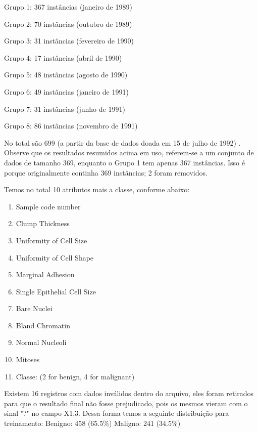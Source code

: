 \documentclass[conference]{IEEEtran}
\begin{document}
\begin{description}
     \item Grupo 1: 367 instâncias (janeiro de 1989)
     \item Grupo 2: 70 instâncias (outubro de 1989)
     \item Grupo 3: 31 instâncias (fevereiro de 1990)
     \item Grupo 4: 17 instâncias (abril de 1990)
     \item Grupo 5: 48 instâncias (agosto de 1990)
     \item Grupo 6: 49 instâncias (janeiro de 1991)
     \item Grupo 7: 31 instâncias (junho de 1991)
     \item Grupo 8: 86 instâncias (novembro de 1991)
\end{description}
    No total são 699 (a partir da base de dados doada em 15 de julho de 1992) \cite{b10} \cite{b11}. Observe que os resultados resumidos acima em uso, referem-se a um conjunto de dados
    de tamanho 369, enquanto o Grupo 1 tem apenas 367 instâncias. Isso é porque originalmente continha 369 instâncias; 2 foram removidos. 
   
   Temos no total 10 atributos mais a classe, conforme abaixo:
    \begin{enumerate}
    
   \item  Sample code number
   \item  Clump Thickness
   \item  Uniformity of Cell Size
   \item  Uniformity of Cell Shape
   \item  Marginal Adhesion
   \item  Single Epithelial Cell Size
   \item  Bare Nuclei
   \item  Bland Chromatin
   \item  Normal Nucleoli
   \item  Mitoses
   \item  Classe: (2 for benign, 4 for malignant)
    \end{enumerate}
    
    Existem 16 registros com dados inválidos dentro do arquivo, eles foram retirados para que o resultado final não fosse prejudicado, pois os mesmos vieram com o sinal "?" no campo X1.3. Dessa forma temos a seguinte distribuição para treinamento: Benigno: 458 (65.5\%) Maligno: 241 (34.5\%)
\end{document}
